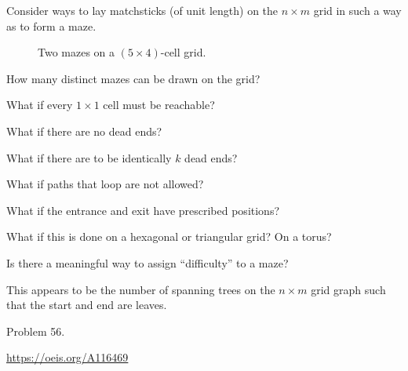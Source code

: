 \documentclass{article}
\begin{document}
Consider ways to lay matchsticks (of unit length) on the $n \times m$ grid in
such a way as to form a maze.
\begin{figure}[ht!]
  \centering
  \hspace{0.5cm}
  \caption{
    Two mazes on a $(5 \times 4)$-cell grid.
  }
\end{figure}
\begin{question}
  How many distinct mazes can be drawn on the grid?
\end{question}

\begin{related}
  \item What if every $1\times1$ cell must be reachable?
  \item What if there are no dead ends?
  \item What if there are to be identically $k$ dead ends?
  \item What if paths that loop are not allowed?
  \item What if the entrance and exit have prescribed positions?
  \item What if this is done on a hexagonal or triangular grid? On a torus?
  \item Is there a meaningful way to assign ``difficulty'' to a maze?
\end{related}
\begin{note}
  This appears to be the number of spanning trees on the $n \times m$ grid graph
  such that the start and end are leaves.
\end{note}
\begin{references}
  \item Problem 56.
  \item \url{https://oeis.org/A116469}
\end{references}
\end{document}
